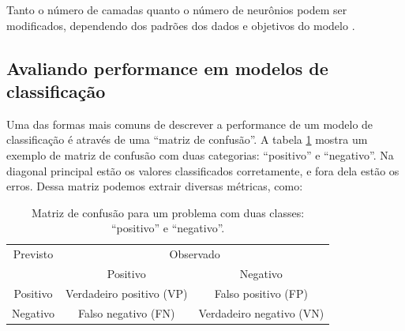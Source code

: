 \documentclass[a4paper,titlepage]{ppgi}\usepackage[]{graphicx}\usepackage[]{color}
\begin{document}
Tanto o número de camadas quanto o número de neurônios podem ser modificados,
dependendo dos padrões dos dados e objetivos do modelo \cite{Kuhn2013}.

\subsection{Avaliando performance em modelos de classificação}
\label{cap:fundamentacao:avaliando-modelos-de-classificacao}

\nocite{Ng2012}

Uma das formas mais comuns de descrever a performance de um modelo de
classificação é através de uma ``matriz de confusão''. A tabela
\ref{table:exemplo-matriz-de-confusao} mostra um exemplo de matriz de confusão
com duas categorias: ``positivo'' e ``negativo''. Na diagonal principal estão
os valores classificados corretamente, e fora dela estão os erros. Dessa matriz
podemos extrair diversas métricas, como:

\begin{table}
\centering
\begin{tabular}{c c c}
  Previsto & \multicolumn{2}{c}{Observado} \\  \cline{2-3}
  & \multicolumn{1}{|c}{Positivo} & \multicolumn{1}{c|}{Negativo} \\
  \hline
  \multicolumn{1}{|c|}{Positivo} & Verdadeiro positivo (VP) & \multicolumn{1}{c|}{Falso positivo (FP)} \\
  \multicolumn{1}{|c|}{Negativo} & Falso negativo (FN) & \multicolumn{1}{c|}{Verdadeiro negativo (VN)} \\
  \hline
\end{tabular}
\caption{Matriz de confusão para um problema com duas classes: ``positivo'' e
``negativo''.}
\label{table:exemplo-matriz-de-confusao}
\end{table}
\end{document}
